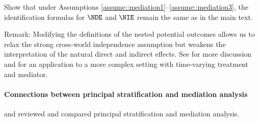 Show that under Assumptions \ref{assume::mediation1}--\ref{assume::mediation3}, the identification formulas for $\NDE$ and $\NIE$ remain the same as in the main text. 



Remark: Modifying the definitions of the nested potential outcomes allows us to relax the strong cross-world independence assumption but weakens the interpretation of the natural direct and indirect effects. See \citet{vanderweele2015explanation} for more discussion and \citet{vanderweele2017mediation} for an application to a more complex setting with time-varying treatment and mediator.

  
  
\paragraph{Connections between principal stratification and mediation analysis}

\citet{vanderweele2008simple} and
\citet{forastiere2018principal} reviewed and compared principal stratification and mediation analysis. 
